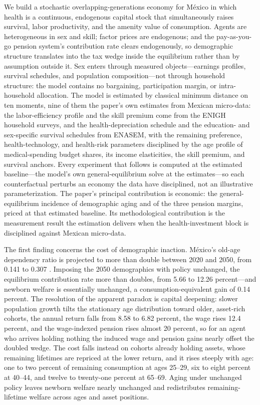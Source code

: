 \documentclass[12pt,a4paper]{article}
\begin{document}
We build a stochastic overlapping-generations economy for M\'exico in which health is a continuous, endogenous capital stock that simultaneously raises survival, labor productivity, and the amenity value of consumption. Agents are heterogeneous in sex and skill; factor prices are endogenous; and the pay-as-you-go pension system's contribution rate clears endogenously, so demographic structure translates into the tax wedge inside the equilibrium rather than by assumption outside it. Sex enters through measured objects---earnings profiles, survival schedules, and population composition---not through household structure: the model contains no bargaining, participation margin, or intra-household allocation. The model is estimated by classical minimum distance on ten moments, nine of them the paper's own estimates from Mexican micro-data: the labor-efficiency profile and the skill premium come from the ENIGH household surveys, and the health-depreciation schedule and the education- and sex-specific survival schedules from ENASEM, with the remaining preference, health-technology, and health-risk parameters disciplined by the age profile of medical-spending budget shares, its income elasticities, the skill premium, and survival anchors. Every experiment that follows is computed at the estimated baseline---the model's own general-equilibrium solve at the estimates---so each counterfactual perturbs an economy the data have disciplined, not an illustrative parameterization. The paper's principal contribution is economic: the general-equilibrium incidence of demographic aging and of the three pension margins, priced at that estimated baseline. Its methodological contribution is the measurement result the estimation delivers when the health-investment block is disciplined against Mexican micro-data.

The first finding concerns the cost of demographic inaction. M\'exico's old-age dependency ratio is projected to more than double between 2020 and 2050, from 0.141 to 0.307 \citep{CONAPO2023}. Imposing the 2050 demographics with policy unchanged, the equilibrium contribution rate more than doubles, from 5.66 to 12.26 percent---and newborn welfare is essentially unchanged, a consumption-equivalent gain of 0.14 percent. The resolution of the apparent paradox is capital deepening: slower population growth tilts the stationary age distribution toward older, asset-rich cohorts, the annual return falls from 8.58 to 6.82 percent, the wage rises 12.4 percent, and the wage-indexed pension rises almost 20 percent, so for an agent who arrives holding nothing the induced wage and pension gains nearly offset the doubled wedge. The cost falls instead on cohorts already holding assets, whose remaining lifetimes are repriced at the lower return, and it rises steeply with age: one to two percent of remaining consumption at ages 25--29, six to eight percent at 40--44, and twelve to twenty-one percent at 65--69. Aging under unchanged policy leaves newborn welfare nearly unchanged and redistributes remaining-lifetime welfare across ages and asset positions.
\end{document}
